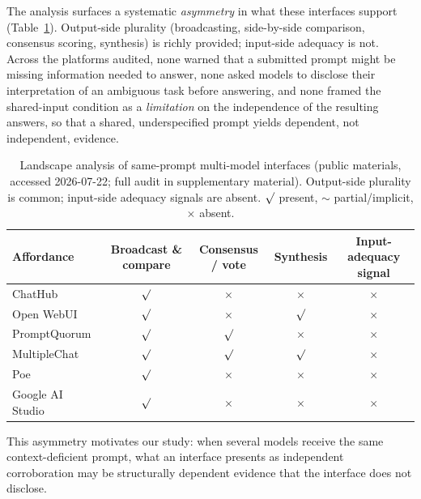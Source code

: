 \documentclass[acmsmall,screen,review,anonymous]{acmart}
\providecommand{\checkmark}{\ensuremath{\surd}}
\begin{document}
The analysis surfaces a systematic \emph{asymmetry} in what these interfaces support (Table~\ref{tab:audit}).
Output-side plurality (broadcasting, side-by-side comparison, consensus scoring, synthesis) is richly
provided; input-side adequacy is not. Across the platforms audited, none warned that a submitted prompt might
be missing information needed to answer, none asked models to disclose their interpretation of an ambiguous
task before answering, and none framed the shared-input condition as a \emph{limitation} on the independence
of the resulting answers, so that a
shared, underspecified prompt yields dependent, not independent, evidence.

\begin{table}[t]
\centering
\small
\caption{Landscape analysis of same-prompt multi-model interfaces (public materials, accessed 2026-07-22;
full audit in supplementary material). Output-side plurality is common; input-side adequacy signals are
absent. $\checkmark$ present, $\sim$ partial/implicit, $\times$ absent.}
\label{tab:audit}
\begin{tabular}{@{}lcccc@{}}
\toprule
Affordance & Broadcast \& compare & Consensus / vote & Synthesis & Input-adequacy signal \\
\midrule
ChatHub~\cite{chathub2026}                       & $\checkmark$ & $\times$ & $\times$ & $\times$ \\
Open WebUI~\cite{openwebui2026multimodel}        & $\checkmark$ & $\times$ & $\checkmark$ & $\times$ \\
PromptQuorum~\cite{promptquorum2026home}         & $\checkmark$ & $\checkmark$ & $\times$ & $\times$ \\
MultipleChat~\cite{multiplechat2026}             & $\checkmark$ & $\checkmark$ & $\checkmark$ & $\times$ \\
Poe~\cite{poe2024multibot}                       & $\checkmark$ & $\times$ & $\times$ & $\times$ \\
Google AI Studio~\cite{googleaistudio2024compare}& $\checkmark$ & $\times$ & $\times$ & $\times$ \\
\bottomrule
\end{tabular}
\end{table}

This asymmetry motivates our study: when several models receive the same context-deficient prompt, what an
interface presents as independent corroboration may be structurally dependent evidence that the interface
does not disclose.
\end{document}
